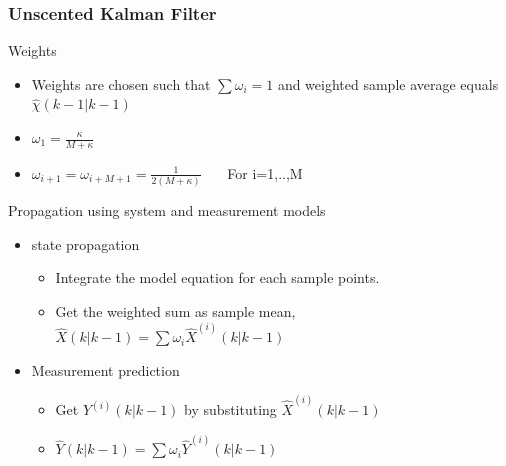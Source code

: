 \documentclass{beamer}
\begin{document}
\begin{frame}
\frametitle{Unscented Kalman Filter}
\begin{block}{Weights}
\begin{itemize}
    \item Weights are chosen such that $\sum \omega_{i}=1$ and weighted sample average equals $\widehat{\chi}(k-1|k-1)$
    \item $\omega_1=\frac{\kappa}{M+\kappa}$
    \item $\omega_{i+1}=\omega_{i+M+1}=\frac{1}{2(M+\kappa)}$ \ \ \ For i=1,..,M
\end{itemize}
\end{block}
\begin{block}{Propagation using system and measurement models}
\begin{itemize}
    \item state propagation
        \begin{itemize}
            \item Integrate the model equation for each sample points.
            \item Get the weighted sum as sample mean, $\widehat{X}(k|k-1)=\sum\omega_i\widehat{X}^{(i)}(k|k-1)$
        \end{itemize}
    \item Measurement prediction
        \begin{itemize}
            \item Get $Y^{(i)}(k|k-1)$ by substituting $\widehat{X}^{(i)}(k|k-1)$ 
            \item $\widehat{Y}(k|k-1)=\sum\omega_i\widehat{Y}^{(i)}(k|k-1)$
        \end{itemize}
\end{itemize}
\end{block}
\end{frame}
\end{document}
